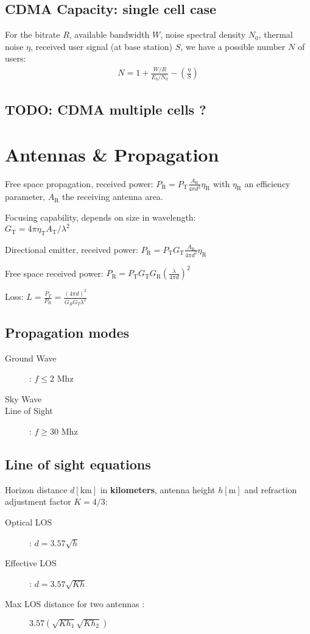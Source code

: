 \documentclass[11pt, a4paper,twocolumn]{scrartcl}
\begin{document}
\subsection{CDMA Capacity: single cell case}
For the bitrate $R$, available bandwidth $W$, noise spectral density $N_0$, thermal noise $\eta$, received user signal (at base station) $S$, we have a possible number $N$ of users:
\begin{align}
	N = 1 + \frac{W/R}{E_b/N_0} - (\frac{\eta}{S})
\end{align}

\subsection{TODO: CDMA multiple cells ?}

\section{Antennas \& Propagation}
Free space propagation, received power: $P_\textrm{R} = P_\textrm{T}\frac{A_\textrm{R}}{4\pi d^2}\eta_\textrm{R}$ with $\eta_\textrm{R}$ an efficiency parameter, $A_\textrm{R}$ the receiving antenna area.

Focusing capability, depends on size in wavelength: \\ $G_\textrm{T} = 4\pi\eta_\textrm{T}A_\textrm{T}/\lambda^2$

Directional emitter, received power: $P_\textrm{R} = P_\textrm{T}G_\textrm{T}\frac{A_\textrm{R}}{4\pi d^2}\eta_\textrm{R}$

Free space received power: $P_\textrm{R} =  P_\textrm{T}G_\textrm{T}G_\textrm{R}(\frac{\lambda}{4\pi d})^2$

Loss: $L = \frac{P_T}{P_R} = \frac{(4\pi d)^2}{G_RG_T\lambda^2} $

\subsection{Propagation modes}
\begin{multicols}{2}
	\begin{description}
		\item[Ground Wave] : $f \le 2$ Mhz
		\item[Sky Wave]
		\item[Line of Sight] : $f \ge 30$ Mhz
	\end{description}
\end{multicols}

\subsection{Line of sight equations}
Horizon distance $d[\textrm{km}]$ in \textbf{kilometers}, antenna height $h[\textrm{m}]$ and refraction adjustment factor $K = 4/3$:
\begin{description}
\item[Optical LOS]: $d = 3.57\sqrt{h}$
\item[Effective LOS]: $d = 3.57\sqrt{Kh}$
\item[Max LOS distance for two antennas :] $3.57(\sqrt{Kh_1} \sqrt{Kh_2})$
\end{description}
\end{document}
